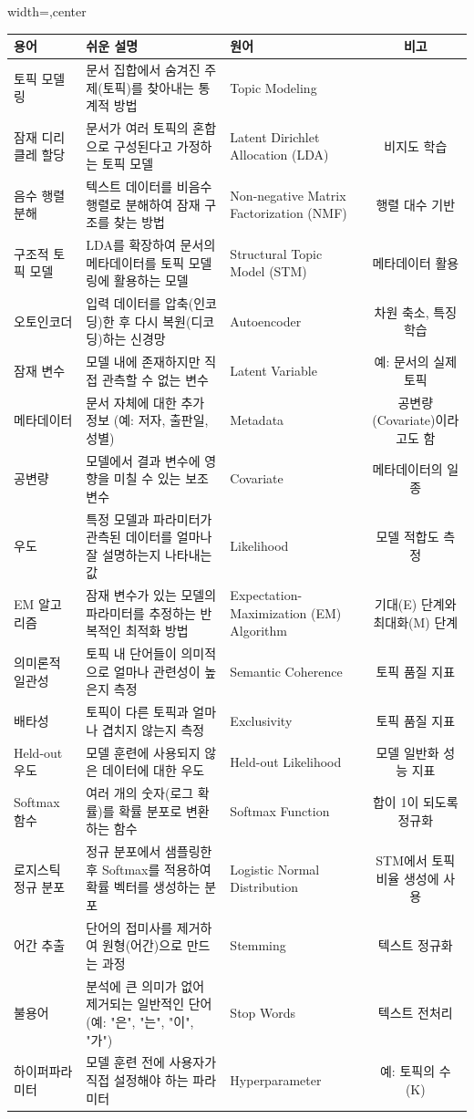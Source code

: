\documentclass[11pt,a4paper]{article}
\begin{document}
\begin{adjustbox}{width=\textwidth,center}
\begin{tabular}{lllc}
\toprule
\textbf{용어} & \textbf{쉬운 설명} & \textbf{원어} & \textbf{비고} \\
\midrule
토픽 모델링 & 문서 집합에서 숨겨진 주제(토픽)를 찾아내는 통계적 방법 & Topic Modeling & \\
잠재 디리클레 할당 & 문서가 여러 토픽의 혼합으로 구성된다고 가정하는 토픽 모델 & Latent Dirichlet Allocation (LDA) & 비지도 학습 \\
음수 행렬 분해 & 텍스트 데이터를 비음수 행렬로 분해하여 잠재 구조를 찾는 방법 & Non-negative Matrix Factorization (NMF) & 행렬 대수 기반 \\
구조적 토픽 모델 & LDA를 확장하여 문서의 메타데이터를 토픽 모델링에 활용하는 모델 & Structural Topic Model (STM) & 메타데이터 활용 \\
오토인코더 & 입력 데이터를 압축(인코딩)한 후 다시 복원(디코딩)하는 신경망 & Autoencoder & 차원 축소, 특징 학습 \\
잠재 변수 & 모델 내에 존재하지만 직접 관측할 수 없는 변수 & Latent Variable & 예: 문서의 실제 토픽 \\
메타데이터 & 문서 자체에 대한 추가 정보 (예: 저자, 출판일, 성별) & Metadata & 공변량(Covariate)이라고도 함 \\
공변량 & 모델에서 결과 변수에 영향을 미칠 수 있는 보조 변수 & Covariate & 메타데이터의 일종 \\
우도 & 특정 모델과 파라미터가 관측된 데이터를 얼마나 잘 설명하는지 나타내는 값 & Likelihood & 모델 적합도 측정 \\
EM 알고리즘 & 잠재 변수가 있는 모델의 파라미터를 추정하는 반복적인 최적화 방법 & Expectation-Maximization (EM) Algorithm & 기대(E) 단계와 최대화(M) 단계 \\
의미론적 일관성 & 토픽 내 단어들이 의미적으로 얼마나 관련성이 높은지 측정 & Semantic Coherence & 토픽 품질 지표 \\
배타성 & 토픽이 다른 토픽과 얼마나 겹치지 않는지 측정 & Exclusivity & 토픽 품질 지표 \\
Held-out 우도 & 모델 훈련에 사용되지 않은 데이터에 대한 우도 & Held-out Likelihood & 모델 일반화 성능 지표 \\
Softmax 함수 & 여러 개의 숫자(로그 확률)를 확률 분포로 변환하는 함수 & Softmax Function & 합이 1이 되도록 정규화 \\
로지스틱 정규 분포 & 정규 분포에서 샘플링한 후 Softmax를 적용하여 확률 벡터를 생성하는 분포 & Logistic Normal Distribution & STM에서 토픽 비율 생성에 사용 \\
어간 추출 & 단어의 접미사를 제거하여 원형(어간)으로 만드는 과정 & Stemming & 텍스트 정규화 \\
불용어 & 분석에 큰 의미가 없어 제거되는 일반적인 단어 (예: "은", "는", "이", "가") & Stop Words & 텍스트 전처리 \\
하이퍼파라미터 & 모델 훈련 전에 사용자가 직접 설정해야 하는 파라미터 & Hyperparameter & 예: 토픽의 수(K) \\
\bottomrule
\end{tabular}
\end{adjustbox}
\end{document}

